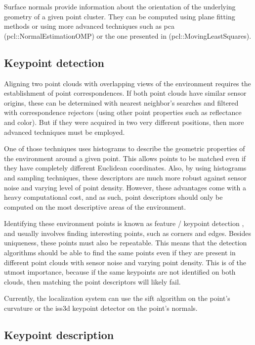 Surface normals provide information about the orientation of the underlying geometry of a given point cluster. They can be computed using plane fitting methods or using more advanced techniques such as \gls{pca} \cite{Jolliffe2002} (pcl::NormalEstimationOMP) or the one presented in  (pcl::MovingLeastSquares).


\subsection{Keypoint detection}

Aligning two point clouds with overlapping views of the environment requires the establishment of point correspondences. If both point clouds have similar sensor origins, these can be determined with nearest neighbor's searches and filtered with correspondence rejectors (using other point properties such as reflectance and color). But if they were acquired in two very different positions, then more advanced techniques must be employed.

One of those techniques uses histograms to describe the geometric properties of the environment around a given point. This allows points to be matched even if they have completely different Euclidean coordinates. Also, by using histograms and sampling techniques, these descriptors are much more robust against sensor noise and varying level of point density. However, these advantages come with a heavy computational cost, and as such, point descriptors should only be computed on the most descriptive areas of the environment.

Identifying these environment points is known as feature / keypoint detection \cite{Filipe2014a}, and usually involves finding interesting points, such as corners and edges. Besides uniqueness, these points must also be repeatable. This means that the detection algorithms should be able to find the same points even if they are present in different point clouds with sensor noise and varying point density. This is of the utmost importance, because if the same keypoints are not identified on both clouds, then matching the point descriptors will likely fail.

Currently, the localization system can use the \gls{sift} \cite{Lowe2004} algorithm on the point's curvature or the \gls{iss3d} \cite{Zhong2009} keypoint detector on the point's normals.


\subsection{Keypoint description}

